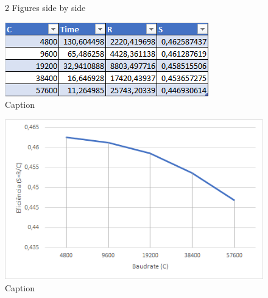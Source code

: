 \documentclass{article}
\begin{document}
\begin{figure}%
	\centering
	\qquad
    \caption{2 Figures side by side}%
    \label{fig:example}%
\end{figure}

\begin{figure}[h]
	\includegraphics[width=\textwidth]{tabelaBaudrate.png}
	\caption{Caption}
\end{figure}

\begin{figure}[h]
	\includegraphics[width=\textwidth]{baudrate.png}
	\caption{Caption}
\end{figure}
\end{document}
